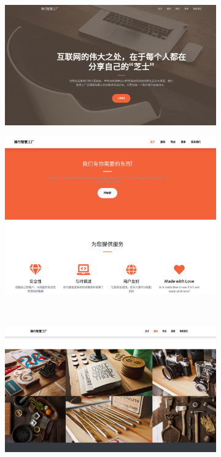 \begin{figure}[H]
    \centering
    \begin{subfigure}{.45\textwidth}
        \centering
        \includegraphics[width=\textwidth]{figures/5index.png}
    \end{subfigure}
    \qquad
    \begin{subfigure}{.45\textwidth}
        \centering
        \includegraphics[width=\textwidth]{figures/5index2.png}
    \end{subfigure}
    \\
    \begin{subfigure}{.45\textwidth}
        \centering
        \includegraphics[width=\textwidth]{figures/5index3.png}

\end{subfigure}
\end{figure}
